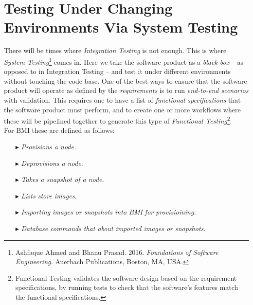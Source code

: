 \section{Testing Under Changing Environments Via System Testing}

There will be times where \emph{Integration Testing} is not enough.  This is where \emph{System Testing}\footnote{Ashfaque Ahmed and Bhanu Prasad. 2016. \emph{Foundations of Software Engineering.} Auerbach Publications, Boston, MA, USA.} comes in.  Here we take the software product as a \emph{black box} --  as opposed to in Integration Testing -- and test it under different environments without touching the code-base.  One of the best ways to ensure that the software product will operate as defined by the \emph{requirements} is to run \emph{end-to-end scenarios} with validation.  This requires one to have a list of \emph{functional specifications} that the software product must perform, and to create one or more workflows where these will be pipelined together to generate this type of \emph{Functional Testing}\footnote{Functional Testing validates the software design based on the requirement specifications, by running tests to check that the software's features match the functional specifications.}.  \\

For BMI these are defined as follows: \\

\begin{itemize}
\item[\code{pro }$\blacktriangleright$\hspace{-12mm}] \hspace{10mm}\emph{Provisions a node.}
\item[\code{dpro }$\blacktriangleright$\hspace{-12mm}] \hspace{10mm}\emph{Deprovisions a node.}
\item[\code{snap }$\blacktriangleright$\hspace{-12mm}] \hspace{10mm}\emph{Takes a snapshot of a node.}
\item[\code{ls }$\blacktriangleright$\hspace{-12mm}] \hspace{10mm}\emph{Lists store images.}
\item[\code{import }$\blacktriangleright$\hspace{-12mm}] \hspace{10mm}\emph{Importing images or snapshots into BMI for provisioining.}
\item[\code{db }$\blacktriangleright$\hspace{-12mm}] \hspace{10mm}\emph{Database commands that about imported images or snapshots.} \\
\end{itemize}

